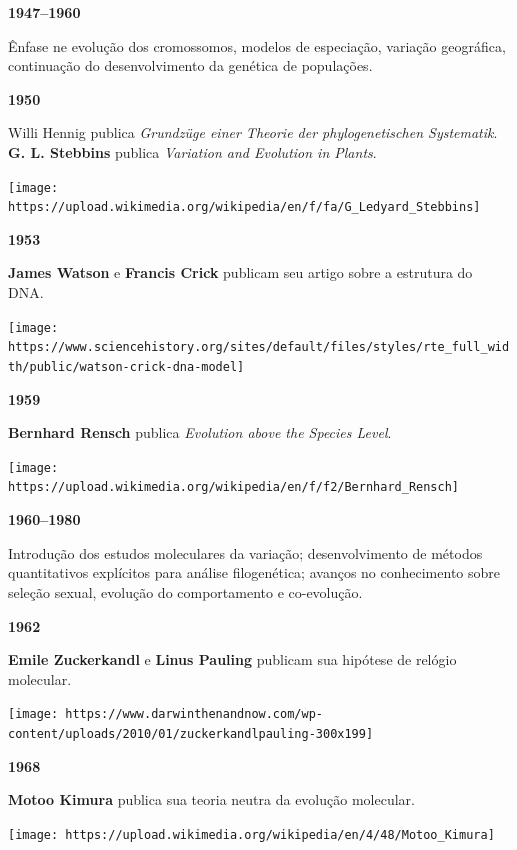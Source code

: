 \documentclass[
]{book}
\begin{document}
\textbf{1947--1960}

Ênfase ne evolução dos cromossomos, modelos de especiação, variação geográfica, continuação do desenvolvimento da genética de populações.

\textbf{1950}

Willi Hennig publica \emph{Grundzüge einer Theorie der phylogenetischen Systematik}. \textbf{G. L. Stebbins} publica \emph{Variation and Evolution in Plants}.

\begin{flushleft}\texttt{[image: https://upload.wikimedia.org/wikipedia/en/f/fa/G\_Ledyard\_Stebbins]} \end{flushleft}

\textbf{1953}

\textbf{James Watson} e \textbf{Francis Crick} publicam seu artigo sobre a estrutura do DNA.

\begin{flushleft}\texttt{[image: https://www.sciencehistory.org/sites/default/files/styles/rte\_full\_width/public/watson-crick-dna-model]} \end{flushleft}

\textbf{1959}

\textbf{Bernhard Rensch} publica \emph{Evolution above the Species Level}.

\begin{flushleft}\texttt{[image: https://upload.wikimedia.org/wikipedia/en/f/f2/Bernhard\_Rensch]} \end{flushleft}

\textbf{1960--1980}

Introdução dos estudos moleculares da variação; desenvolvimento de métodos quantitativos explícitos para análise filogenética; avanços no conhecimento sobre seleção sexual, evolução do comportamento e co-evolução.

\textbf{1962}

\textbf{Emile Zuckerkandl} e \textbf{Linus Pauling} publicam sua hipótese de relógio molecular.

\begin{flushleft}\texttt{[image: https://www.darwinthenandnow.com/wp-content/uploads/2010/01/zuckerkandlpauling-300x199]} \end{flushleft}

\textbf{1968}

\textbf{Motoo Kimura} publica sua teoria neutra da evolução molecular.

\begin{flushleft}\texttt{[image: https://upload.wikimedia.org/wikipedia/en/4/48/Motoo\_Kimura]} \end{flushleft}
\end{document}
